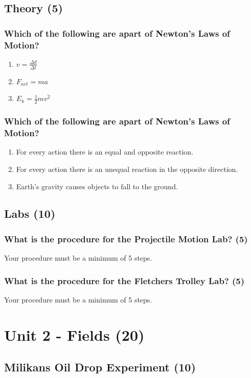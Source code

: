 \documentclass{article}
\begin{document}
\subsection{Theory (5)}
\subsubsection{Which of the following are apart of Newton's Laws of Motion?}
\begin{enumerate}[label=\alph*)]
    \item $v = \frac{\Delta d}{\Delta t}$
    \item $F_{net} = ma$
    \item $E_{k} = \frac{1}{2}mv^2$
\end{enumerate}\leavevmode
\subsubsection{Which of the following are apart of Newton's Laws of Motion?}
\begin{enumerate}[label=\alph*)]
    \item For every action there is an equal and opposite reaction.
    \item For every action there is an unequal reaction in the opposite direction.
    \item Earth's gravity causes objects to fall to the ground.
\end{enumerate}

\subsection{Labs (10)}
\subsubsection{What is the procedure for the Projectile Motion Lab? (5)}
Your procedure must be a minimum of 5 steps.

\subsubsection{What is the procedure for the Fletchers Trolley Lab? (5)}
Your procedure must be a minimum of 5 steps.

\section{Unit 2 - Fields (20)}
\subsection{Milikans Oil Drop Experiment (10)}
\end{document}
